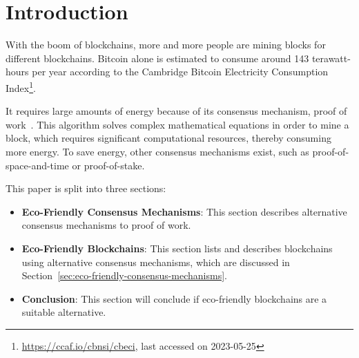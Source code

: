 
\section{Introduction}\label{sec:introduction}
With the boom of blockchains, more and more people are mining blocks for different blockchains.
Bitcoin alone is estimated to consume around 143 terawatt-hours per year according to the Cambridge Bitcoin Electricity Consumption Index\footnote{\url{https://ccaf.io/cbnsi/cbeci}, last accessed on 2023-05-25}.

It requires large amounts of energy because of its consensus mechanism, proof of work~\cite{why-does-bitcoin-use-so-much-energy}.
This algorithm solves complex mathematical equations in order to mine a block, which requires significant computational resources, thereby consuming more energy.
To save energy, other consensus mechanisms exist, such as proof-of-space-and-time or proof-of-stake.

This paper is split into three sections:
\begin{itemize}
    \item \textbf{Eco-Friendly Consensus Mechanisms}: This section describes alternative consensus mechanisms to proof of work.
    \item \textbf{Eco-Friendly Blockchains}: This section lists and describes blockchains using alternative consensus mechanisms, which are discussed in Section~\ref{sec:eco-friendly-consensus-mechanisms}.
    \item \textbf{Conclusion}: This section will conclude if eco-friendly blockchains are a suitable alternative.
\end{itemize}
